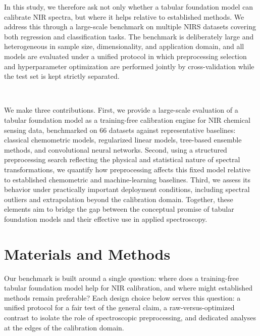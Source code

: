 \documentclass{article}
\begin{document}
In this study, we therefore ask not only whether a tabular foundation model can calibrate NIR spectra, but where it helps relative to established methods. We address this through a large-scale benchmark on multiple NIRS datasets covering both regression and classification tasks. The benchmark is deliberately large and heterogeneous in sample size, dimensionality, and application domain, and all models are evaluated under a unified protocol in which preprocessing selection and hyperparameter optimization are performed jointly by cross-validation while the test set is kept strictly separated.

~

We make three contributions. First, we provide a large-scale evaluation of a tabular foundation model as a training-free calibration engine for NIR chemical sensing data, benchmarked on 66 datasets against representative baselines: classical chemometric models, regularized linear models, tree-based ensemble methods, and convolutional neural networks. Second, using a structured preprocessing search reflecting the physical and statistical nature of spectral transformations, we quantify how preprocessing affects this fixed model relative to established chemometric and machine-learning baselines. Third, we assess its behavior under practically important deployment conditions, including spectral outliers and extrapolation beyond the calibration domain. Together, these elements aim to bridge the gap between the conceptual promise of tabular foundation models and their effective use in applied spectroscopy.



\section{Materials and Methods} \label{sec:experimental_setup}

Our benchmark is built around a single question: where does a training-free tabular foundation model help for NIR calibration, and where might established methods remain preferable? Each design choice below serves this question: a unified protocol for a fair test of the general claim, a raw-versus-optimized contrast to isolate the role of spectroscopic preprocessing, and dedicated analyses at the edges of the calibration domain.
\end{document}
